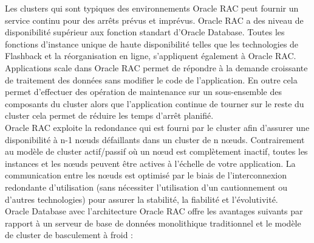 \documentclass[12pt]{report}
\begin{document}
Les clusters qui sont typiques des environnements Oracle RAC peut fournir un
service continu pour des arrêts prévus et imprévus. Oracle RAC a des niveau de
disponibilité supérieur aux fonction standart d'Oracle Database. Toutes les
fonctions d'instance unique de haute disponibilité telles que les technologies
de Flashback et la réorganisation en ligne, s'appliquent également à Oracle
RAC. Applications scale dans Oracle RAC permet de répondre à la demande
croissante de traitement des données sans modifier le code de l'application. En
outre cela permet d'effectuer des opération de maintenance sur un sous-ensemble
des composants du cluster  alors que l'application continue de tourner sur le
reste du cluster cela permet de réduire les temps d'arrêt planifié. \\


Oracle RAC exploite la redondance qui est fourni par le cluster afin d'assurer
une disponibilité à n-1 nœuds défaillants dans un cluster de n
nœuds. Contrairement au modèle de cluster actif/passif où un nœud est
complètement inactif, toutes les instances et les nœuds peuvent être actives à
l'échelle de votre application. La communication entre les nœuds est optimisé
par le biais de l'interconnexion redondante d'utilisation (sans nécessiter
l'utilisation d'un cautionnement ou d'autres technologies) pour assurer la
stabilité, la fiabilité et l'évolutivité.\\
 

Oracle Database avec l'architecture Oracle RAC offre les avantages suivants par
rapport à un serveur de base de données monolithique traditionnel et le modèle
de cluster de basculement à froid : \\
\end{document}
